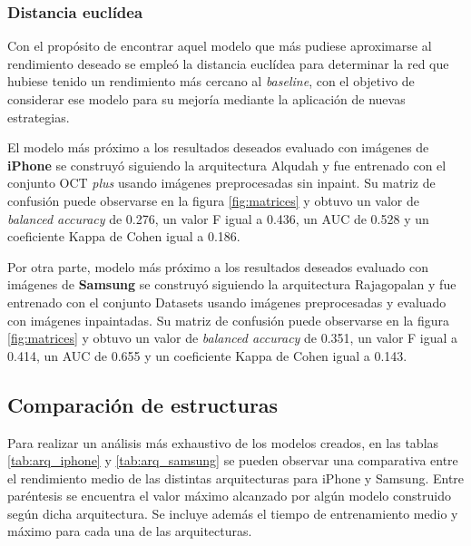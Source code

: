 \subsubsection{Distancia euclídea}

Con el propósito de encontrar aquel modelo que más pudiese aproximarse al rendimiento deseado se empleó la distancia euclídea para determinar la red que hubiese tenido un rendimiento más cercano al \textit{baseline}, con el objetivo de considerar ese modelo para su mejoría mediante la aplicación de nuevas estrategias.

El modelo más próximo a los resultados deseados evaluado con imágenes de \textbf{iPhone} se construyó siguiendo la arquitectura Alqudah y fue entrenado con el conjunto OCT \textit{plus} usando imágenes preprocesadas sin inpaint. Su matriz de confusión puede observarse en la figura \ref{fig:matrices} y obtuvo un valor de \textit{balanced accuracy} de 0.276, un valor F igual a 0.436, un AUC de 0.528 y un coeficiente Kappa de Cohen igual a 0.186.

Por otra parte, modelo más próximo a los resultados deseados evaluado con imágenes de \textbf{Samsung} se construyó siguiendo la arquitectura Rajagopalan y fue entrenado con el conjunto Datasets usando imágenes preprocesadas y evaluado con imágenes inpaintadas. Su matriz de confusión puede observarse en la figura \ref{fig:matrices} y obtuvo un valor de \textit{balanced accuracy} de 0.351, un valor F igual a 0.414, un AUC de 0.655 y un coeficiente Kappa de Cohen igual a 0.143.

\subsection{Comparación de estructuras}

Para realizar un análisis más exhaustivo de los modelos creados, en las tablas \ref{tab:arq_iphone} y \ref{tab:arq_samsung} se pueden observar una comparativa entre el rendimiento medio de las distintas arquitecturas para iPhone y Samsung. Entre paréntesis se encuentra el valor máximo alcanzado por algún modelo construido según dicha arquitectura. Se incluye además el tiempo de entrenamiento medio y máximo para cada una de las arquitecturas.

